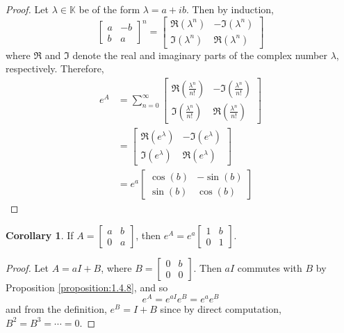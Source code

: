 \documentclass[11pt]{book}
\theoremstyle{definition}\newtheorem{definition}[subsection]{Definition}
\theoremstyle{definition}\newtheorem{example}[subsection]{Example}
\theoremstyle{definition}\newtheorem{notation}[subsection]{Notation}
\theoremstyle{definition}\newtheorem{remark}[subsection]{Remark}
\theoremstyle{theorem}\newtheorem{theorem}[subsection]{Theorem}
\theoremstyle{theorem}\newtheorem{lemma}[subsection]{Lemma}
\theoremstyle{theorem}\newtheorem{proposition}[subsection]{Proposition}
\theoremstyle{theorem}\newtheorem{corollary}[subsection]{Corollary}
\theoremstyle{theorem}\newtheorem{case}{Case}
\theoremstyle{remark}\newtheorem{subcase}{Subcase}[case]
\newcommand{\K}{\mathbb{K}}
\begin{document}
\begin{proof}
    Let $\lambda \in \K$ be of the form $\lambda = a + ib$. Then by induction,
    \begin{equation*}
        \begin{bmatrix} a & -b \\ b & a \end{bmatrix}^n = \begin{bmatrix} \Re(\lambda^n) & -\Im(\lambda^n) \\ \Im(\lambda^n) & \Re(\lambda^n) \end{bmatrix}
    \end{equation*}
    where $\Re$ and $\Im$ denote the real and imaginary parts of the complex number $\lambda$, respectively. Therefore,
    \begin{align*}
        e^A &= \sum_{n = 0}^{\infty} \begin{bmatrix} \Re\left(\frac{\lambda^n}{n!}\right) & -\Im\left(\frac{\lambda^n}{n!}\right) \\ \Im\left(\frac{\lambda^n}{n!}\right) & \Re\left(\frac{\lambda^n}{n!}\right) \end{bmatrix} \\
        &= \begin{bmatrix} \Re(e^{\lambda}) & -\Im(e^{\lambda}) \\ \Im(e^{\lambda}) & \Re(e^{\lambda}) \end{bmatrix} \\
        &= e^a\begin{bmatrix} \cos(b) & -\sin(b) \\ \sin(b) & \cos(b) \end{bmatrix}
    \end{align*}
\end{proof}

\begin{corollary}\label{corollary:1.4.12}
    If $A = \begin{bmatrix} a & b \\ 0 & a \end{bmatrix}$, then $e^A = e^a \begin{bmatrix} 1 & b \\ 0 & 1 \end{bmatrix}$.
\end{corollary}

\begin{proof}
    Let $A = aI + B$, where $B = \begin{bmatrix} 0 & b \\ 0 & 0 \end{bmatrix}$. Then $aI$ commutes with $B$ by Proposition \ref{proposition:1.4.8}, and so 
    \begin{equation*}
        e^A = e^{aI} e^B = e^ae^B
    \end{equation*}
    and from the definition, $e^B = I + B$ since by direct computation, $B^2 = B^3 = \cdots = 0$.
\end{proof}
\end{document}
